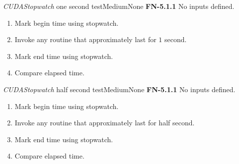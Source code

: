 \begin{testcase}{\emph{CUDAStopwatch} one second test}{Medium}{None}
	{
		\textbf{FN-5.1.1}
	}
	{
		No inputs defined.
	}
	{
		\begin{enumerate}
			\item Mark begin time using stopwatch.
			\item Invoke any routine that approximately last for $1$ second.
			\item Mark end time using stopwatch.
			\item Compare elapsed time.
		\end{enumerate}
	}
\end{testcase}
\begin{testcase}{\emph{CUDAStopwatch} half second test}{Medium}{None}
	{
		\textbf{FN-5.1.1}
	}
	{
		No inputs defined.
	}
	{
		\begin{enumerate}
			\item Mark begin time using stopwatch.
			\item Invoke any routine that approximately last for half second.
			\item Mark end time using stopwatch.
			\item Compare elapsed time.
		\end{enumerate}
	}
\end{testcase}